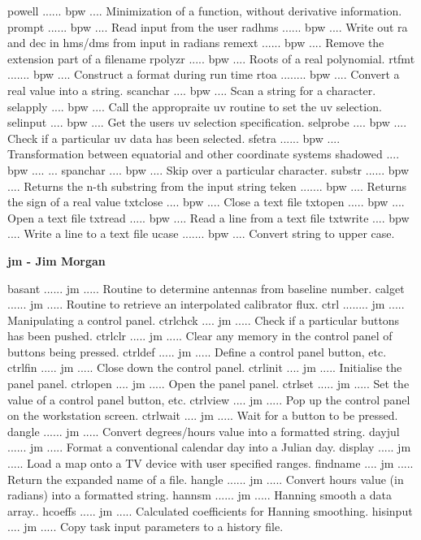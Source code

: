 {\eightpoint\begintt
powell ...... bpw .... Minimization of a function, without derivative information. 
prompt ...... bpw .... Read input from the user 
radhms ...... bpw .... Write out ra and dec in hms/dms from input in radians 
remext ...... bpw .... Remove the extension part of a filename 
rpolyzr ..... bpw .... Roots of a real polynomial. 
\endtt}
{\eightpoint\begintt
rtfmt ....... bpw .... Construct a format during run time 
rtoa ........ bpw .... Convert a real value into a string. 
scanchar .... bpw .... Scan a string for a character. 
selapply .... bpw .... Call the appropraite uv routine to set the uv selection. 
selinput .... bpw .... Get the users uv selection specification. 
\endtt}
{\eightpoint\begintt
selprobe .... bpw .... Check if a particular uv data has been selected. 
sfetra ...... bpw .... Transformation between equatorial and other coordinate systems 
shadowed .... bpw .... ... 
spanchar .... bpw .... Skip over a particular character. 
substr ...... bpw .... Returns the n-th substring from the input string 
\endtt}
{\eightpoint\begintt
teken ....... bpw .... Returns the sign of a real value 
txtclose .... bpw .... Close a text file 
txtopen ..... bpw .... Open a text file 
txtread ..... bpw .... Read a line from a text file 
txtwrite .... bpw .... Write a line to a text file 
\endtt}
{\eightpoint\begintt
ucase ....... bpw .... Convert string to upper case. 
\endtt}
\par\centerline {\bf jm - Jim Morgan}
{\eightpoint\begintt
basant ...... jm ..... Routine to determine antennas from baseline number. 
calget ...... jm ..... Routine to retrieve an interpolated calibrator flux. 
ctrl ........ jm ..... Manipulating a control panel. 
ctrlchck .... jm ..... Check if a particular buttons has been pushed. 
ctrlclr ..... jm ..... Clear any memory in the control panel of buttons being pressed. 
\endtt}
{\eightpoint\begintt
ctrldef ..... jm ..... Define a control panel button, etc. 
ctrlfin ..... jm ..... Close down the control panel. 
ctrlinit .... jm ..... Initialise the panel panel. 
ctrlopen .... jm ..... Open the panel panel. 
ctrlset ..... jm ..... Set the value of a control panel button, etc. 
\endtt}
{\eightpoint\begintt
ctrlview .... jm ..... Pop up the control panel on the workstation screen. 
ctrlwait .... jm ..... Wait for a button to be pressed. 
dangle ...... jm ..... Convert degrees/hours value into a formatted string. 
dayjul ...... jm ..... Format a conventional calendar day into a Julian day. 
display ..... jm ..... Load a map onto a TV device with user specified ranges. 
\endtt}
{\eightpoint\begintt
findname .... jm ..... Return the expanded name of a file. 
hangle ...... jm ..... Convert hours value (in radians) into a formatted string.
hannsm ...... jm ..... Hanning smooth a data array.. 
hcoeffs ..... jm ..... Calculated coefficients for Hanning smoothing. 
hisinput .... jm ..... Copy task input parameters to a history file. 
\endtt}
